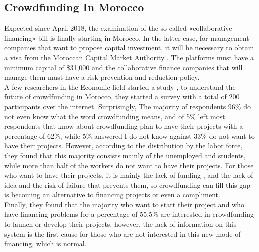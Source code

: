\subsection*{ Crowdfunding In Morocco }
Expected since April 2018, the examination of the so-called «collaborative financing» bill is finally starting in Morocco. In the latter case, for management companies that want to propose capital investment, it will be necessary to obtain a visa from the Moroccan Capital Market Authority . The platforms must have a minimum capital of \$31,000 and the collaborative finance companies that will manage them must have a risk prevention and reduction policy.\\
A few researchers in the Economic field started a study \cite{crowdMorocco}, to understand the future of crowdfunding in Morocco, they started a survey with a total of 200 participants over the internet. Surprisingly,  The majority of respondents 96\% do not even know what the word crowdfunding means, and of 5\% left most respondents that know about crowdfunding plan to have their projects with a percentage of 62\%, while 5\% answered I do not know against 33\% do not want to have their projects. However, according to the distribution by the labor force, they found that this majority consists mainly of the unemployed and students, while more than half of the workers do not want to have their projects. For those who want to have their projects, it is mainly the lack of funding , and the lack of idea and the risk of failure that prevents them, so crowdfunding can fill this gap is becoming an alternative to financing projects or even a compliment.\\
Finally, they found that the majority who want to start their project and who have financing problems for a percentage of 55.5\% are interested in crowdfunding to launch or develop their projects, however, the lack of information on this system is the first cause for those who are not interested in this new mode of financing, which is normal.

